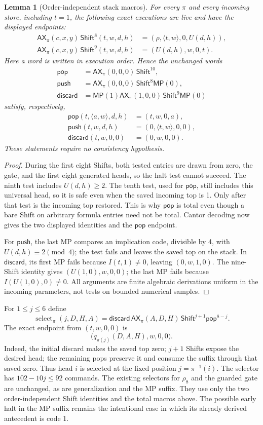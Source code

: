 \documentclass[10pt]{article}
\newtheorem{lemma}[theorem]{Lemma}
\newcommand{\Sh}{\mathsf{Shift}}
\newcommand{\Ax}{\mathsf{AX}}
\newcommand{\Mp}{\mathsf{MP}}
\newcommand{\Pop}{\mathsf{pop}}
\newcommand{\Push}{\mathsf{push}}
\newcommand{\Drop}{\mathsf{discard}}
\begin{document}
\begin{lemma}[Order-independent stack macros]
For every $\pi$ and every incoming store, including $t=1$, the
following exact executions are live and have the displayed endpoints:
\begin{align*}
 \Ax_\pi(c,x,y)\,\Sh^8(t,w,d,h)
   &=(\rho,\langle t,w\rangle,0,U(d,h)),\\
 \Ax_\pi(c,x,y)\,\Sh^9(t,w,d,h)
   &=(U(d,h),w,0,t).
\end{align*}
Here a word is written in execution order.  Hence the unchanged words
\begin{align*}
 \Pop&=\Ax_\pi(0,0,0)\,\Sh^{10},\\
 \Push&=\Ax_\pi(0,0,0)\,\Sh^8\Mp(0),\\
 \Drop&=\Mp(1)\Ax_\pi(1,0,0)\,\Sh^9\Mp(0)
\end{align*}
satisfy, respectively,
\begin{align*}
 \Pop(t,\langle a,w\rangle,d,h)&=(t,w,0,a),\\
 \Push(t,w,d,h)&=(0,\langle t,w\rangle,0,0),\\
 \Drop(t,w,0,0)&=(0,w,0,0).
\end{align*}
These statements require no consistency hypothesis.
\end{lemma}
\begin{proof}
During the first eight Shifts, both tested entries are drawn from
zero, the gate, and the first eight generated heads, so the halt
test cannot succeed.  The ninth test includes $U(d,h)\geq2$.
The tenth test, used for $\Pop$, still includes this universal head,
so it is safe even when the saved incoming top is 1.  Only after
that test is the incoming top restored.  This is why $\Pop$ is
total even though a bare Shift on arbitrary formula entries need
not be total.  Cantor decoding now gives the two displayed identities
and the $\Pop$ endpoint.

For $\Push$, the last MP compares an implication code, divisible by
4, with $U(d,h)\equiv2\pmod4$; the test fails and leaves the saved
top on the stack.  In $\Drop$, its first MP fails because
$I(t,1)\ne0$, leaving $(0,w,1,0)$.  The nine-Shift identity gives
$(U(1,0),w,0,0)$; the last MP fails because $I(U(1,0),0)\ne0$.
All arguments are finite algebraic derivations uniform in the
incoming parameters, not tests on bounded numerical samples.
\end{proof}

For $1\leq j\leq6$ define
\[
 \operatorname{select}_\pi(j,D,H,A)
   =\Drop\,\Ax_\pi(A,D,H)\,\Sh^{j+1}\Pop^{8-j}.
\]
The exact endpoint from $(t,w,0,0)$ is
\[
 \bigl(q_{\pi(j)}(D,A,H),w,0,0\bigr).
\]
Indeed, the initial discard makes the saved top zero; $j+1$
Shifts expose the desired head; the remaining pops preserve it
and consume the suffix through that saved zero.  Thus head $i$
is selected at the fixed position $j=\pi^{-1}(i)$.
The selector has $102-10j\leq92$ commands.
The existing selectors for $\rho_8$ and the guarded gate are
unchanged, as are generalization and the MP suffix.  They use only
the two order-independent Shift identities and the total macros
above.  The possible early halt in the MP suffix remains the
intentional case in which its already derived antecedent is code 1.
\end{document}
